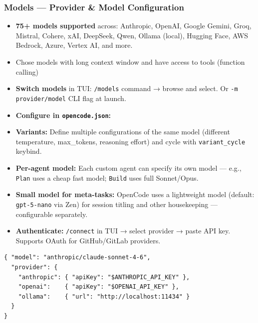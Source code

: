 \begin{frame}[fragile]\frametitle{Models — Provider \& Model Configuration}
  \begin{itemize}
    \item \textbf{75+ models supported} across: Anthropic, OpenAI, Google Gemini, Groq, Mistral, Cohere, xAI, DeepSeek, Qwen, Ollama (local), Hugging Face, AWS Bedrock, Azure, Vertex AI, and more.
	\item Chose models with long context window and have access to tools (function calling)
    \item \textbf{Switch models} in TUI: \texttt{/models} command → browse and select. Or \texttt{-m provider/model} CLI flag at launch.
    \item \textbf{Configure in \texttt{opencode.json}:}
    \item \textbf{Variants:} Define multiple configurations of the same model (different temperature, max\_tokens, reasoning effort) and cycle with \texttt{variant\_cycle} keybind.
    \item \textbf{Per-agent model:} Each custom agent can specify its own model — e.g., \texttt{Plan} uses a cheap fast model; \texttt{Build} uses full Sonnet/Opus.
    \item \textbf{Small model for meta-tasks:} OpenCode uses a lightweight model (default: \texttt{gpt-5-nano} via Zen) for session titling and other housekeeping — configurable separately.
    \item \textbf{Authenticate:} \texttt{/connect} in TUI → select provider → paste API key. Supports OAuth for GitHub/GitLab providers.
  \end{itemize}
\begin{lstlisting}
{ "model": "anthropic/claude-sonnet-4-6",
  "provider": {
    "anthropic": { "apiKey": "$ANTHROPIC_API_KEY" },
    "openai":    { "apiKey": "$OPENAI_API_KEY" },
    "ollama":    { "url": "http://localhost:11434" }
  }
}
\end{lstlisting}  
\end{frame}





